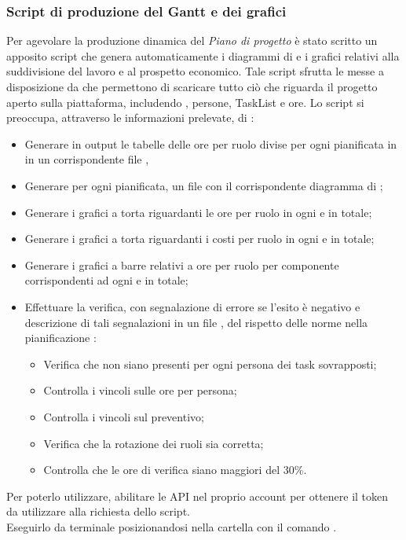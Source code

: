\subsubsection{Script di produzione del Gantt e dei grafici}
		\label{Gantt}
Per agevolare la produzione dinamica del \textit{Piano di progetto} è stato scritto un apposito script che genera automaticamente i diagrammi di  e i grafici relativi alla suddivisione del lavoro e al prospetto economico.
Tale script sfrutta le  messe a disposizione da  che permettono di scaricare tutto ciò che riguarda il progetto aperto sulla piattaforma, includendo , persone, TaskList e ore.
Lo script si preoccupa, attraverso le informazioni prelevate, di :
\begin{itemize}
\item Generare in output le tabelle delle ore per ruolo divise per ogni  pianificata in  in un corrispondente file ,
\item Generare per ogni  pianificata, un file  con il corrispondente diagramma di ;
\item Generare i grafici a torta riguardanti le ore per ruolo in ogni  e in totale;
\item Generare i grafici a torta riguardanti i costi per ruolo in ogni  e in totale;
\item Generare i grafici a barre relativi a ore per ruolo per componente corrispondenti ad ogni  e in totale;
\item Effettuare la verifica, con segnalazione di errore se l'esito è negativo e descrizione di tali segnalazioni in un file , del rispetto delle norme nella pianificazione : 
	\begin{itemize}
	\item Verifica che non siano presenti per ogni persona dei task sovrapposti;
	\item Controlla i vincoli sulle ore per persona;
	\item Controlla i vincoli sul preventivo;
	\item Verifica che la rotazione dei ruoli sia corretta;
	\item Controlla che le ore di verifica siano maggiori del 30$\%$.
	\end{itemize}
\end{itemize} 
Per poterlo utilizzare, abilitare le API nel proprio account  per ottenere il token da utilizzare alla richiesta dello script. \\
Eseguirlo da terminale posizionandosi nella cartella  con il comando .

